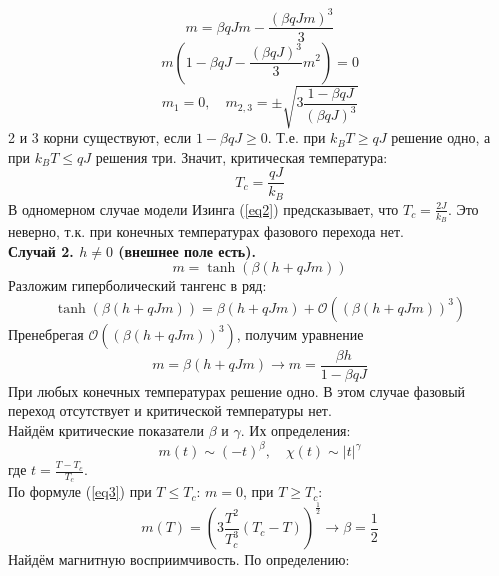 \documentclass[12pt]{article}
\begin{document}
\begin{enumerate}
    \begin{equation}
        m=\beta qJm-\frac{(\beta qJm)^3}{3}
    \end{equation}
    \begin{equation}
        m\left(1-\beta qJ-\frac{(\beta qJ)^3}{3}m^2\right)=0
    \end{equation}
    \begin{equation}\label{eq3}
        m_1=0, \quad m_{2,3}=\pm\sqrt{3\frac{1-\beta qJ}{(\beta qJ)^3}}
    \end{equation}
    2 и 3 корни существуют, если $1-\beta qJ\geq 0$. Т.е. при $k_B T\geq qJ$ решение одно, а при $k_B T\leq qJ$ решения три. Значит, критическая температура:
    \begin{equation}\label{eq2}
        \boxed{T_c=\frac{qJ}{k_B}}
    \end{equation}
    В одномерном случае модели Изинга (\ref{eq2}) предсказывает, что $T_c=\frac{2J}{k_B}$. Это неверно, т.к. при конечных температурах фазового перехода нет.\\
    \textbf{Случай 2. $h\neq 0$ (внешнее поле есть).}\\
    \begin{equation}
        m=\tanh(\beta(h+qJm))
    \end{equation}
    Разложим гиперболический тангенс в ряд:
    \begin{equation}
        \tanh(\beta (h+qJm))=\beta (h+qJm)+\mathcal{O}((\beta (h+qJm))^3)
    \end{equation}
    Пренебрегая $\mathcal{O}((\beta (h+qJm))^3)$, получим уравнение
    \begin{equation}
        m=\beta (h+qJm)\rightarrow m=\frac{\beta h}{1-\beta qJ}
    \end{equation}
    При любых конечных температурах решение одно. В этом случае фазовый переход отсутствует и критической температуры нет.\\
    Найдём критические показатели $\beta$ и $\gamma$. Их определения:
    \begin{equation}
        m(t)\sim(-t)^\beta,\quad \chi(t)\sim|t|^\gamma
    \end{equation}
    где $t=\frac{T-T_c}{T_c}$.\\
    По формуле (\ref{eq3}) при $T\leq T_c$: $m=0$, при $T\geq T_c$:
    \begin{equation}
        m(T)=\left(3\frac{T^2}{T_c^3}(T_c-T)\right)^\frac{1}{2}\rightarrow \boxed{\beta=\frac{1}{2}}
    \end{equation}
    Найдём магнитную восприимчивость. По определению:

\end{enumerate}
\end{document}
